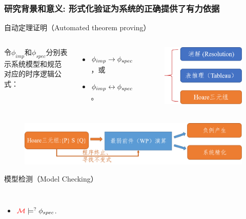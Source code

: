 \documentclass[9pt, CJK]{beamer}
\begin{document}
	\begin{frame}
		\frametitle{研究背景和意义: {\small 形式化验证为系统的正确提供了有力依据}} 
		\begin{block}{自动定理证明（Automated theorem proving）}
			\begin{columns}
				令$\phi_{imp}$和$\phi_{spec}$分别表示系统模型和规范对应的时序逻辑公式：
				\begin{itemize}
					\item $\phi_{imp} \rightarrow \phi_{spec}$，或
					\item $\phi_{imp} \leftrightarrow \phi_{spec}$。
				\end{itemize}
				\begin{figure}
					\includegraphics[scale=0.3]{figures/atp}
				\end{figure}
			\end{columns} 
			\begin{figure}
				\includegraphics[scale=0.3]{figures/hoareTriple}
			\end{figure}
		\end{block}
		\vskip 0.5pt
		\begin{block}{模型检测（Model Checking）}
			\begin{columns}
				\column{0.5\textwidth} 
				\begin{itemize}
					\item $\textcolor{red}{{\cal M}} \models^? \phi_{spec}$.

\end{itemize}
\end{columns}
\end{block}
\end{frame}
\end{document}
